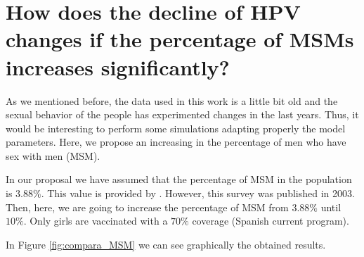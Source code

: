 \section{How does the decline of HPV changes if the percentage of MSMs increases significantly?}

As we mentioned before, the data used in this work is a little bit old and the sexual behavior of the people has experimented changes in the last years. Thus, it would be interesting to perform some simulations adapting properly the model parameters. Here, we propose an increasing in the percentage of men who have sex with men (MSM).

In our proposal we have assumed that the percentage of MSM in the population is $3.88\%$. This value is provided by \cite{INE}. However, this survey was published in 2003. Then, here, we are going to increase the percentage of MSM from $3.88\%$ until $10\%$.  Only girls are vaccinated with a $70\%$ coverage (Spanish current program).

In Figure \ref{fig:compara_MSM} we can see graphically the obtained results. 

